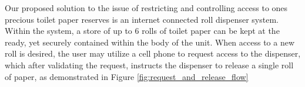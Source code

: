 
\par Our proposed solution to the issue of restricting and controlling access to ones precious toilet paper reserves is an internet connected roll dispenser system.  Within the system, a store of up to 6 rolls of toilet paper can be kept at the ready, yet securely contained within the body of the unit.  When access to a new roll is desired, the user may utilize a cell phone to request access to the dispenser, which after validating the request, instructs the dispenser to release a single roll of paper, as demonstrated in Figure \ref{fig:request_and_release_flow}




